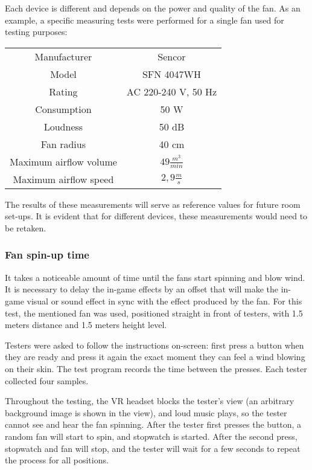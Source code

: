 Each device is different and depends on the power and quality of the fan.
As an example, a specific measuring tests were performed for a single fan
used for testing purposes:


\begin{center}
\begin{tabular}{|c|c|}
\hline
Manufacturer & Sencor \\ 
Model & SFN 4047WH \\ 
Rating & AC 220-240 V, 50 Hz \\ 
Consumption & 50 W \\ 
Loudness & 50 dB \\ 
Fan radius & 40 cm \\ 
Maximum airflow volume & $ 49 \frac{m^3}{min} $ \\ 
Maximum airflow speed & $ 2,9 \frac{m}{s} $ \\ 
\hline
\end{tabular}
\end{center}

The results of these measurements will serve as reference values for future
room set-ups. It is evident that for different devices, these measurements
would need to be retaken.


\hypertarget{x-fan-spin-up-time}{\subsubsection*{Fan spin-up time}}
It takes a noticeable amount of time until the fans start spinning and
blow wind. It is necessary to delay the in-game effects by an offset that
will make the in-game visual or sound effect in sync with the effect
produced by the fan.
For this test, the mentioned fan was used, positioned straight in front of
testers, with 1.5 meters distance and 1.5 meters height level.


Testers were asked to follow the instructions on-screen: first press a button
when they are ready and press it again the exact moment they can feel a wind
blowing on their skin. The test program records the time between the presses.
Each tester collected four samples.


Throughout the testing, the VR headset blocks the tester’s view (an arbitrary
background image is shown in the view), and loud music plays, so the tester
cannot see and hear the fan spinning. After the tester first presses the button,
a random fan will start to spin, and stopwatch is started. After the second
press, stopwatch and fan will stop, and the tester will wait for a few seconds
to repeat the process for all positions.


